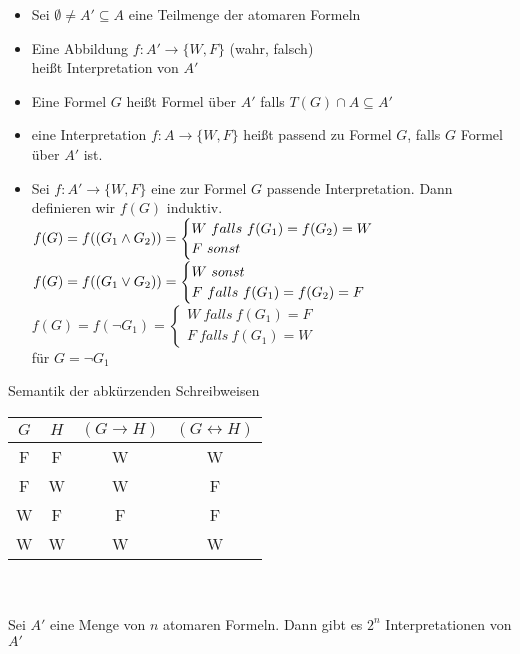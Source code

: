 \begin{itemize}
\item Sei $\emptyset \neq A' \subseteq A$ eine Teilmenge der atomaren Formeln
\item Eine Abbildung $f: A' \rightarrow \{W,F\}$ \hspace{1cm} (wahr, falsch)\\
    heißt Interpretation von $A'$
\item Eine Formel $G$ heißt Formel über $A'$ falls $T(G) \cap A \subseteq A'$
\item eine Interpretation $f: A \rightarrow \{W, F\}$ heißt passend zu Formel $G$, falls $G$ Formel über $A'$ ist.
\item Sei $f: A' \rightarrow \{W, F\}$ eine zur Formel $G$ passende Interpretation. Dann definieren wir $f(G)$ induktiv.\\
    $f(G) = f(( G_1 \AND G_2 )) = \begin{cases} W\ falls\ f(G_1) = f(G_2) = W \\ F\ sonst\end{cases}$\\
    $f(G) = f((G_1 \OR G_2)) = \begin{cases} W\ sonst \\ F\ falls\ f(G_1)=f(G_2)=F \end{cases}$\\
    $f(G) = f(\neg G_1) = \begin{cases} W\ falls\ f(G_1)=F \\ F\ falls\ f(G_1)=W \end{cases}$\\
    für $G=\neg G_1$
\end{itemize}

\beispiel{}
Semantik der abkürzenden Schreibweisen\\

\begin{tabular}{c|c|c|c}
$G$ & $H$ & $(G \rightarrow H)$ & $(G \leftrightarrow H)$\\
\hline
F & F & W & W\\
F & W & W & F\\
W & F & F & F\\
W & W & W & W\\
\end{tabular}\\
\\
Sei $A'$ eine Menge von $n$ atomaren Formeln. Dann gibt es $2^n$ Interpretationen von $A'$\\

